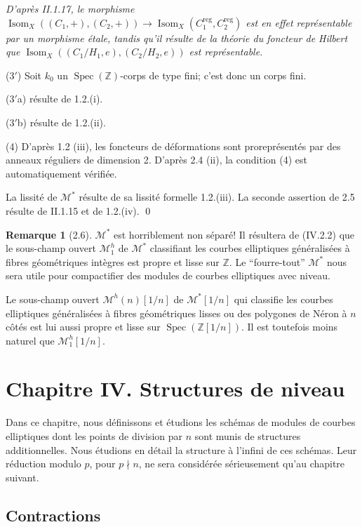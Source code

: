 \documentclass[11pt,a4paper]{amsart}
\theoremstyle{plain}
\theoremstyle{definition}
\newtheorem{remark}[theorem]{Remarque}
\DeclareMathOperator{\Isom}{Isom}
\DeclareMathOperator{\Spec}{Spec}
\DeclareMathOperator{\reg}{reg}
\newcommand{\mll}{\mathcal{M}}
\newcommand{\ZZ}{\mathbb{Z}}
\begin{document}
\textit{D'apr\`es II.1.17, le morphisme $\Isom_X((C_1,+),(C_2,+)) \to \Isom_X(C_1^{\reg},C_2^{\reg})$ est en effet repr\'esentable par un morphisme \'etale, tandis qu'il r\'esulte de la th\'eorie du foncteur de Hilbert que $\Isom_X((C_1/H_1,e),(C_2/H_2,e))$ est repr\'esentable.}

\medskip

(3$'$) Soit $k_0$ un $\Spec(\ZZ)$-corps de type fini; c'est donc un corps fini.

(3$'$a) r\'esulte de 1.2.(i).

(3$'$b) r\'esulte de 1.2.(ii).

(4) D'apr\`es 1.2 (iii), les foncteurs de d\'eformations sont prorepr\'esent\'es par des anneaux r\'eguliers de dimension 2. D'apr\`es 2.4 (ii), la condition (4) est automatiquement v\'erifi\'ee.

La lissit\'e de $\mll^*$ r\'esulte de sa lissit\'e formelle 1.2.(iii). La seconde assertion de 2.5 r\'esulte de II.1.15 et de 1.2.(iv).
\qed

\begin{remark}[2.6]
$\mll^*$ est horriblement non s\'epar\'e! Il r\'esultera de (IV.2.2) que le sous-champ ouvert $\mll^h_1$ de $\mll^*$ classifiant les courbes elliptiques g\'en\'eralis\'ees \`a fibres g\'eom\'etriques int\`egres est propre et lisse sur $\ZZ$. Le ``fourre-tout'' $\mll^*$ nous sera utile pour compactifier des modules de courbes elliptiques avec niveau.

Le sous-champ ouvert $\mll^h(n)[1/n]$ de $\mll^*[1/n]$ qui classifie les courbes elliptiques g\'en\'eralis\'ees \`a fibres g\'eom\'etriques lisses ou des polygones de N\'eron \`a $n$ c\^ot\'es est lui aussi propre et lisse sur $\Spec(\ZZ[1/n])$. Il est toutefois moins naturel que $\mll^h_1[1/n]$.
\end{remark}


\section{Chapitre IV. Structures de niveau}

Dans ce chapitre, nous d\'efinissons et \'etudions les sch\'emas de modules de courbes elliptiques dont les points de division par $n$ sont munis de structures additionnelles. Nous \'etudions en d\'etail la structure \`a l'infini de ces sch\'emas. Leur r\'eduction modulo $p$, pour $p \nmid n$, ne sera consid\'er\'ee s\'erieusement qu'au chapitre suivant.

\subsection{Contractions}
\end{document}
